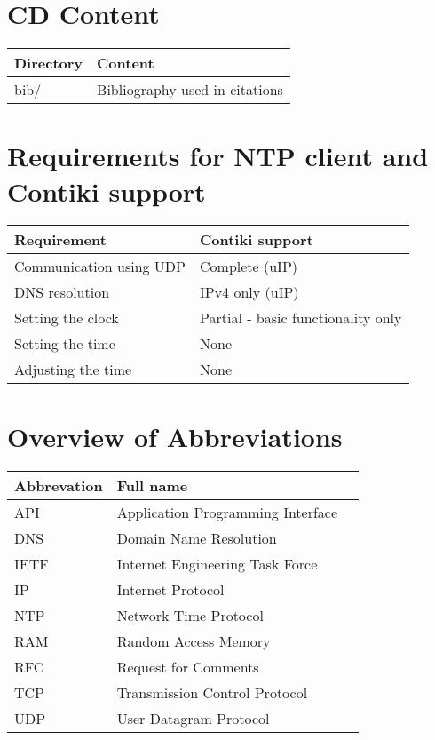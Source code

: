 
\chapter{CD Content}
\begin{tabular}{|l|l|}
	\hline
	Directory & Content \\ \hline
	bib/ & Bibliography used in citations \\
	\hline
\end{tabular}

\chapter{Requirements for NTP client and Contiki support}
\begin{tabular}{|l|l|}
	\hline
	Requirement & Contiki support \\ \hline
	Communication using UDP & Complete (uIP) \\
	DNS resolution & IPv4 only (uIP) \\
	Setting the clock & Partial - basic functionality only \\
	Setting the time & None \\
	Adjusting the time & None \\
\end{tabular}

\chapter{Overview of Abbreviations}
\begin{tabular}{|l|l|l|}
	\hline
	Abbrevation & Full name \\ \hline
	API & Application Programming Interface\\
	DNS & Domain Name Resolution \\
	IETF & Internet Engineering Task Force \\
	IP & Internet Protocol \\
	NTP & Network Time Protocol \\
	RAM & Random Access Memory \\
	RFC & Request for Comments \\
	TCP & Transmission Control Protocol \\
	UDP & User Datagram Protocol \\
	\hline
\end{tabular}
	
